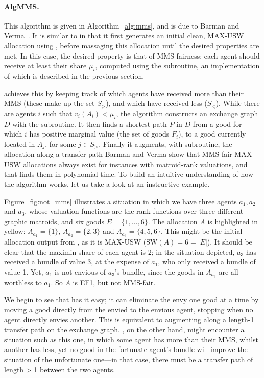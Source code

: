 \paragraph{AlgMMS.} This algorithm is given in Algorithm~\ref{alg:mms}, and is due to Barman and Verma~\cite{barman2021existence}. It is similar to  in that it first generates an initial clean, MAX-USW allocation using , before massaging this allocation until the desired properties are met. In this case, the desired property is that of MMS-fairness; each agent should receive at least their share $\mu_i$, computed using the  subroutine, an implementation of which is described in the previous section.

 achieves this by keeping track of which agents have received more than their MMS (these make up the set $S_>$), and which have received less ($S_<$). While there are agents $i$ such that $v_i(A_i) < \mu_i$, the algorithm constructs an exchange graph $D$ with the  subroutine. It then finds a shortest path $P$ in $D$ from a good for which $i$ has positive marginal value (the set of goods $F_i$), to a good currently located in $A_j$, for some $j\in S_>$. Finally it augments, with  subroutine, the allocation along a transfer path  Barman and Verma show that MMS-fair MAX-USW allocations always exist for instances with matroid-rank valuations, and that  finds them in polynomial time. To build an intuitive understanding of how the algorithm works, let us take a look at an instructive example.



Figure~\ref{fig:not_mms} illustrates a situation in which we have three agents $a_1, a_2$ and $a_3$, whose valuation functions are the rank functions over three different graphic matroids, and six goods $E=\{1,\dots,6\}$. The allocation $A$ is highlighted in yellow: $A_{a_1} = \{1\}$, $A_{a_2} = \{2,3\}$ and $A_{a_3} = \{4,5,6\}$. This might be the initial allocation output from , as it is MAX-USW (SW$(A) = 6 = |E|$). It should be clear that the maximin share of each agent is 2; in the situation depicted, $a_3$ has received a bundle of value 3, at the expense of $a_1$, who only received a bundle of value 1. Yet, $a_1$ is not envious of $a_3$'s bundle, since the goods in $A_{a_3}$ are all worthless to $a_1$. So $A$ is EF1, but not MMS-fair. 

We begin to see that  has it easy; it can eliminate the envy one good at a time by moving a good directly from the envied to the envious agent, stopping when no agent directly envies another. This is equivalent to augmenting along a length-1 transfer path on the exchange graph. , on the other hand, might encounter a situation such as this one, in which some agent has more than their MMS, whilst another has less, yet no good in the fortunate agent's bundle will improve the situation of the unfortunate one---in that case, there must be a transfer path of length > 1 between the two agents.

